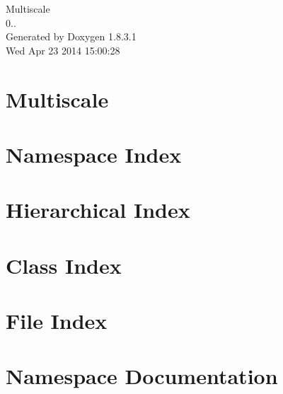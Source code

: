 \documentclass{book}
\begin{document}
\hypersetup{pageanchor=false,citecolor=blue}
\begin{titlepage}
\vspace*{7cm}
\begin{center}
{\Large Multiscale \\[1ex]\large 0.. }\\
\vspace*{1cm}
{\large Generated by Doxygen 1.8.3.1}\\
\vspace*{0.5cm}
{\small Wed Apr 23 2014 15:00:28}\\
\end{center}
\end{titlepage}
\clearemptydoublepage
{}
\tableofcontents
\clearemptydoublepage
{}
\hypersetup{pageanchor=true,citecolor=blue}
\chapter{Multiscale}
\label{index}\hypertarget{index}{}
\chapter{Namespace Index}

\chapter{Hierarchical Index}

\chapter{Class Index}

\chapter{File Index}

\chapter{Namespace Documentation}






\end{document}
